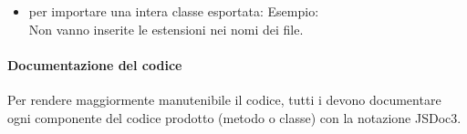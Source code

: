 \begin{itemize}
\begin{itemize}
            				\item per importare una intera classe esportata: Esempio: \\  Non vanno inserite le estensioni nei nomi dei file.
            			\end{itemize}
            	\end{itemize}
            	
           		\paragraph{Documentazione del codice}
           		Per rendere maggiormente manutenibile il codice, tutti i \programmatori{} devono documentare ogni componente del codice prodotto (metodo o classe) con la notazione JSDoc3.
           		
